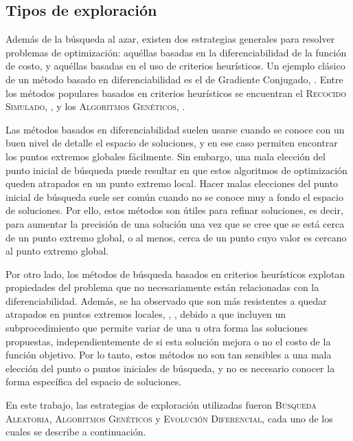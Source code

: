 \subsection{Tipos de exploración}

Además de la búsqueda al azar, existen dos estrategias generales para resolver problemas de optimización: aquéllas basadas en la diferenciabilidad de la función de costo, y aquéllas basadas en el uso de criterios heurísticos.
Un ejemplo clásico de un método basado en diferenciabilidad es el de Gradiente Conjugado, \citeauthor{numrecipesc} \citep{numrecipesc}. Entre los métodos populares basados en criterios heurísticos se encuentran el \textsc{Recocido Simulado}, \citeauthor{Kirkpatrick1983} \citep{Kirkpatrick1983}, y los \textsc{Algoritmos Genéticos}, \citeauthor{Goldberg1989} \citep{Goldberg1989}.

Las métodos basados en diferenciabilidad suelen usarse cuando se conoce con un buen nivel de detalle el espacio de soluciones, y en ese caso permiten encontrar los puntos extremos globales fácilmente. Sin embargo, una mala elección del punto inicial de búsqueda puede resultar en que estos algoritmos de optimización queden atrapados en un punto extremo local. Hacer malas elecciones del punto inicial de búsqueda suele ser común cuando no se conoce muy a fondo el espacio de soluciones. Por ello, estos métodos son útiles para refinar soluciones, es decir, para aumentar la precisión de una solución una vez que se cree que se está cerca de un punto extremo global, o al menos, cerca de un punto cuyo valor es cercano al punto extremo global.

Por otro lado, los métodos de búsqueda basados en criterios heurísticos explotan propiedades del problema que no necesariamente están relacionadas con la diferenciabilidad. Además, se ha observado que son más resistentes a quedar atrapados en puntos extremos locales, \citeauthor{BangaMoles2003} \citep{BangaMoles2003}, \citeauthor{Storn1997} \citep{Storn1997}, debido a que incluyen un subprocedimiento que permite variar de una u otra forma las soluciones propuestas, independientemente de si esta solución mejora o no el costo de la función objetivo. Por lo tanto, estos métodos no son tan sensibles a una mala elección del punto o puntos iniciales de búsqueda, y no es necesario conocer la forma específica del espacio de soluciones.

En este trabajo, las estrategias de exploración utilizadas fueron \textsc{Búsqueda Aleatoria}, \textsc{Algoritmos Genéticos} y \textsc{Evolución Diferencial}, cada uno de los cuales se describe a continuación.

